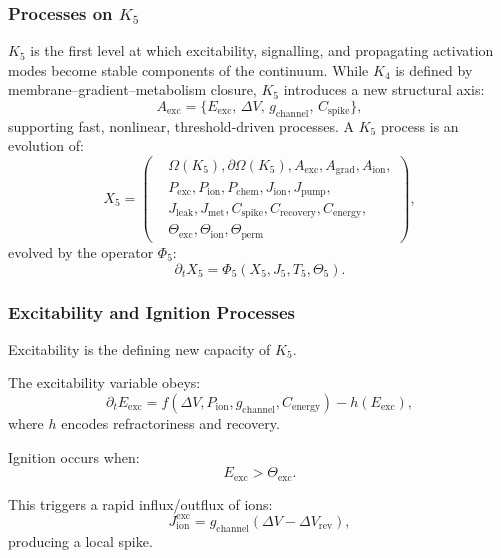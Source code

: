 

\subsubsection{Processes on \texorpdfstring{$K_5$}{K_5}}
\label{sec:processes-k5}

$K_5$ is the first level at which excitability, signalling, and
propagating activation modes become stable components of the continuum.
While $K_4$ is defined by membrane–gradient–metabolism closure,
$K_5$ introduces a new structural axis:
\[
A_{\text{exc}} = \{E_{\text{exc}},\, \Delta V,\, g_{\text{channel}},\, C_{\text{spike}}\},
\]
supporting fast, nonlinear, threshold-driven processes.
A $K_5$ process is an evolution of:
\[
X_5 =
\left(
\begin{aligned}
&\Omega(K_5), \partial\Omega(K_5), A_{\text{exc}}, A_{\text{grad}}, A_{\text{ion}},\\
&P_{\text{exc}}, P_{\text{ion}}, P_{\text{chem}}, J_{\text{ion}}, J_{\text{pump}},\\
&J_{\text{leak}}, J_{\text{met}}, C_{\text{spike}}, C_{\text{recovery}}, C_{\text{energy}},\\
&\Theta_{\text{exc}}, \Theta_{\text{ion}}, \Theta_{\text{perm}}
\end{aligned}
\right),
\]
evolved by the operator $\Phi_5$:
\[
\partial_t X_5 = \Phi_5(X_5, J_5, T_5, \Theta_5).
\]

\subsubsection{Excitability and Ignition Processes}

Excitability is the defining new capacity of $K_5$.

The excitability variable obeys:
\[
\partial_t E_{\text{exc}} =
f(\Delta V, P_{\text{ion}}, g_{\text{channel}}, C_{\text{energy}})
- h(E_{\text{exc}}),
\]
where $h$ encodes refractoriness and recovery.

Ignition occurs when:
\[
E_{\text{exc}} > \Theta_{\text{exc}}.
\]

This triggers a rapid influx/outflux of ions:
\[
J_{\text{ion}}^{\text{exc}} = g_{\text{channel}}(\Delta V - \Delta V_{\text{rev}}),
\]
producing a local spike.

